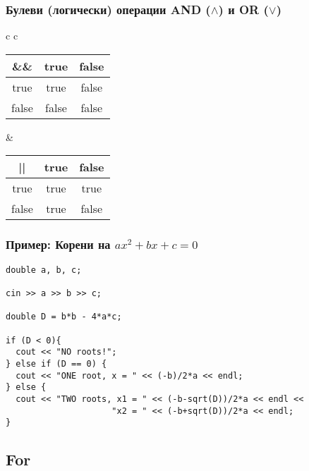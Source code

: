 \documentclass{beamer}
\begin{document}
\begin{frame}[fragile]
\frametitle{Булеви (логически) операции AND ($\wedge$) и OR ($\vee$)}

\begin{center}


\begin{tabular}{ c c }

\begin{tabular}{ c | c  c }
  \hline
  \&\&  & true  & false \\ \hline
  true  & true  & false \\
  false & false & false \\

\end{tabular} &

\begin{tabular}{ c | c  c }
  \hline
  ||  & true  & false \\ \hline
  true  & true  & true \\
  false & true & false \\

\end{tabular}

\end{tabular}
\end{center}



\end{frame}


\begin{frame}[fragile]
\frametitle{Пример: Корени на $ax^2+bx+c=0$}

\begin{lstlisting}
double a, b, c;

cin >> a >> b >> c;

double D = b*b - 4*a*c;

if (D < 0){
  cout << "NO roots!";
} else if (D == 0) {
  cout << "ONE root, x = " << (-b)/2*a << endl;
} else {
  cout << "TWO roots, x1 = " << (-b-sqrt(D))/2*a << endl <<
                     "x2 = " << (-b+sqrt(D))/2*a << endl;
}

\end{lstlisting}


\end{frame}


\subsection{For}
\end{document}
